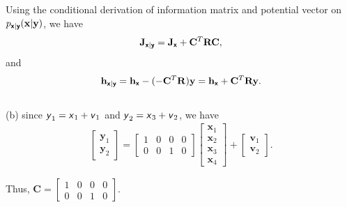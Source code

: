 \documentclass{article}
\newcommand{\s}[1]{\textsf{\textit{#1}}}
\newcommand{\bs}[1]{\textsf{\textbf{#1}}}
\newcommand{\bm}{\mathbf}
\begin{document}
Using the conditional derivation of information matrix and potential vector on $p_{\bs{x}|\bs{y}}(\bm{x}| \bm{y})$, we have
\begin{align*}
	\bm{J}_{\bs{x}|\bs{y}} = \bm{J}_\bs{x}+\bm{C}^T\bm{R}\bm{C},
\end{align*}
and
\begin{align*}
	\bm{h}_{\bs{x}|\bs{y}} = \bm{h}_{\bs{x}} - (-\bm{C}^T\bm{R})\bm{y} = \bm{h}_{\bs{x}} + \bm{C}^T\bm{R}\bm{y}.
\end{align*}
\\

\noindent
(b) since $\s{y}_1 = \s{x}_1 + \s{v}_1$ and $\s{y}_2 = \s{x}_3 + \s{v}_2$, we have
\begin{align*}
\begin{bmatrix}
    \bm{y}_{1}\\
    \bm{y}_{2}
\end{bmatrix} = 
\begin{bmatrix}
    1 & 0 & 0 & 0 \\
    0 & 0 & 1 & 0
\end{bmatrix}
\begin{bmatrix}
    \bm{x}_{1}\\
    \bm{x}_{2}\\
    \bm{x}_{3}\\
    \bm{x}_{4}
\end{bmatrix} + 
\begin{bmatrix}
    \bm{v}_{1}\\
    \bm{v}_{2}
\end{bmatrix}.
\end{align*}
%

Thus, $\bm{C} =
\begin{bmatrix}
    1 & 0 & 0 & 0 \\
    0 & 0 & 1 & 0
\end{bmatrix}$.
%
\end{document}
